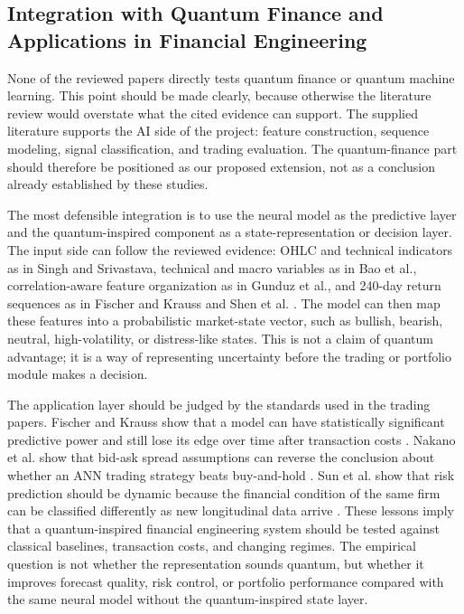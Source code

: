 \documentclass[conference]{IEEEtran}
\begin{document}
\subsection{Integration with Quantum Finance and Applications in Financial Engineering}
None of the reviewed papers directly tests quantum finance or quantum machine learning. This point should be made clearly, because otherwise the literature review would overstate what the cited evidence can support. The supplied literature supports the AI side of the project: feature construction, sequence modeling, signal classification, and trading evaluation. The quantum-finance part should therefore be positioned as our proposed extension, not as a conclusion already established by these studies.

The most defensible integration is to use the neural model as the predictive layer and the quantum-inspired component as a state-representation or decision layer. The input side can follow the reviewed evidence: OHLC and technical indicators as in Singh and Srivastava, technical and macro variables as in Bao et al., correlation-aware feature organization as in Gunduz et al., and 240-day return sequences as in Fischer and Krauss and Shen et al. \cite{singh2017stock,bao2017deep,gunduz2017intraday,fischer2018deep,shen2018gru}. The model can then map these features into a probabilistic market-state vector, such as bullish, bearish, neutral, high-volatility, or distress-like states. This is not a claim of quantum advantage; it is a way of representing uncertainty before the trading or portfolio module makes a decision.

The application layer should be judged by the standards used in the trading papers. Fischer and Krauss show that a model can have statistically significant predictive power and still lose its edge over time after transaction costs \cite{fischer2018deep}. Nakano et al. show that bid-ask spread assumptions can reverse the conclusion about whether an ANN trading strategy beats buy-and-hold \cite{nakano2018bitcoin}. Sun et al. show that risk prediction should be dynamic because the financial condition of the same firm can be classified differently as new longitudinal data arrive \cite{sun2011sffs}. These lessons imply that a quantum-inspired financial engineering system should be tested against classical baselines, transaction costs, and changing regimes. The empirical question is not whether the representation sounds quantum, but whether it improves forecast quality, risk control, or portfolio performance compared with the same neural model without the quantum-inspired state layer.
\end{document}

